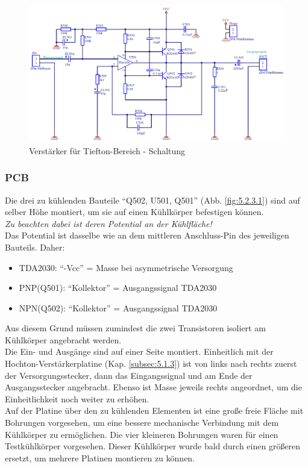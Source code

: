 \begin{figure} [H]
	\centering	
	\includegraphics[width=1\textwidth]{img/Print5/5_TTVerstaerker-Schem.PNG}
	\caption{Verstärker für Tiefton-Bereich - Schaltung}
	\label {fig:5.2.2.1}
\end{figure}

\newpage
\subsubsection{PCB}\label{subsec:5.2.3}
Die drei zu kühlenden Bauteile \enquote{Q502, U501, Q501} (Abb. \ref{fig:5.2.3.1}) sind auf selber Höhe montiert, um sie auf einen Kühlkörper befestigen können.\\
\emph{Zu beachten dabei ist deren Potential an der Kühlfläche!}\\
Das Potential ist dasselbe wie an dem mittleren Anschluss-Pin des jeweiligen Bauteils.
Daher:
\begin{itemize}
	\item TDA2030: \enquote{-Vcc} = Masse bei asymmetrische Versorgung
	\item PNP(Q501): \enquote{Kollektor} = Ausgangssignal TDA2030
	\item NPN(Q502): \enquote{Kollektor} = Ausgangssignal TDA2030
\end{itemize}

Aus diesem Grund müssen zumindest die zwei Transistoren isoliert am Kühlkörper angebracht werden.\\
Die Ein- und Ausgänge sind auf einer Seite montiert. 
Einheitlich mit der Hochton-Verstärkerplatine (Kap. \ref{subsec:5.1.3}) ist von links nach rechts zuerst der Versorgungsstecker, dann das Eingangssignal und am Ende der Ausgangsstecker angebracht.
Ebenso ist Masse jeweils rechts angeordnet, um die Einheitlichkeit noch weiter zu erhöhen.\\
Auf der Platine über den zu kühlenden Elementen ist eine große freie Fläche mit Bohrungen vorgesehen, um eine bessere mechanische Verbindung mit dem Kühlkörper zu ermöglichen.
Die vier kleineren Bohrungen waren für einen Testkühlkörper vorgesehen. 
Dieser Kühlkörper wurde bald durch einen größeren ersetzt, um mehrere Platinen montieren zu können.

